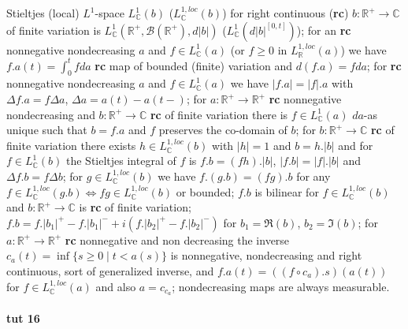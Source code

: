 \documentclass[a4paper]{article}
\newcommand{\Bcal}{\mathcal{B}}
\newcommand{\real}{\mathbb{R}}
\newcommand{\cplx}{\mathbb{C}}
\begin{document}
Stieltjes (local) $L^1$-space $L^1_\cplx(b)$ ($L^{1,loc}_\cplx(b)$) for right continuous
({\bf rc}) $b\colon \real^+ \to \cplx$ of finite variation is
$L_\cplx^1(\real^+, \Bcal(\real^+), d|b|)$ ($L_\cplx^1(d|b|^{[0,t]})$);
%
for an {\bf rc} nonnegative nondecreasing $a$ and $f \in L^1_\cplx(a)$ (or $f \geq 0$ in
$L^{1,loc}_\real(a)$) we have $f.a(t) = \int_0^t f da$ {\bf rc} map of bounded (finite)
variation and $d(f.a) = f da$;
%
for {\bf rc} nonnegative nondecreasing $a$ and $f \in L^1_\cplx(a)$ we have
$|f.a| = |f|.a$ with $\Delta f.a = f\Delta a$, $\Delta a = a(t) - a(t-)$;
%
for $a\colon \real^+ \to \real^+$ {\bf rc} nonnegative nondecreasing and
$b\colon \real^+ \to \cplx$ {\bf rc} of finite variation there is $f \in L^1_\cplx(a)$
$da$-as unique such that $b = f.a$ and $f$ preserves the co-domain of $b$;
%
for $b\colon \real^+ \to \cplx$ {\bf rc} of finite variation there exists
$h \in L^{1,loc}_\cplx(b)$ with $|h|=1$ and $b = h.|b|$ and for $f \in L^1_\cplx(b)$
the Stieltjes integral of $f$ is $f.b = (f h).|b|$, $|f.b| = |f|.|b|$ and
$\Delta f.b = f \Delta b$;
%
for $g \in L^{1,loc}_\cplx(b)$ we have $f.(g.b) = (fg).b$ for any
$f \in L^{1,loc}_\cplx(g.b) \Leftrightarrow fg \in L^{1,loc}_\cplx(b)$ or bounded;
%
$f.b$ is bilinear for $f \in L^{1,loc}_\cplx(b)$ and $b\colon \real^+ \to \cplx$
is {\bf rc} of finite variation;
%
$f.b = f.|b_1|^+ - f.|b_1|^- + i(f.|b_2|^+ - f.|b_2|^-)$ for $b_1 = \Re(b)$, $b_2 = \Im(b)$;
%
for $a\colon \real^+ \to \real^+$ {\bf rc} nonnegative and non decreasing the inverse
$c_a(t) = \inf\{s \geq 0 \mid t < a(s) \}$ is nonnegative, nondecreasing and right
continuous, sort of generalized inverse, and $f.a(t) = ((f \circ c_a).s)(a(t))$ for
$f \in L^{1,loc}_\cplx(a)$ and also $a = c_{c_a}$;
%
nondecreasing maps are always measurable.



\paragraph{tut 16} %
\label{par:tut_16}
\end{document}
